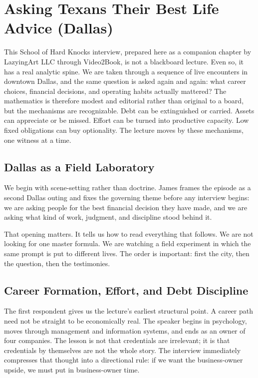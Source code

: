 \chapter{Asking Texans Their Best Life Advice (Dallas)}

This School of Hard Knocks interview, prepared here as a companion chapter by LazyingArt LLC through Video2Book, is not a blackboard lecture. Even so, it has a real analytic spine. We are taken through a sequence of live encounters in downtown Dallas, and the same question is asked again and again: what career choices, financial decisions, and operating habits actually mattered? The mathematics is therefore modest and editorial rather than original to a board, but the mechanisms are recognizable. Debt can be extinguished or carried. Assets can appreciate or be missed. Effort can be turned into productive capacity. Low fixed obligations can buy optionality. The lecture moves by these mechanisms, one witness at a time.

\section{Dallas as a Field Laboratory}

We begin with scene-setting rather than doctrine. James frames the episode as a second Dallas outing and fixes the governing theme before any interview begins: we are asking people for the best financial decision they have made, and we are asking what kind of work, judgment, and discipline stood behind it.

That opening matters. It tells us how to read everything that follows. We are not looking for one master formula. We are watching a field experiment in which the same prompt is put to different lives. The order is important: first the city, then the question, then the testimonies.

\section{Career Formation, Effort, and Debt Discipline}

The first respondent gives us the lecture's earliest structural point. A career path need not be straight to be economically real. The speaker begins in psychology, moves through management and information systems, and ends as an owner of four companies. The lesson is not that credentials are irrelevant; it is that credentials by themselves are not the whole story. The interview immediately compresses that thought into a directional rule: if we want the business-owner upside, we must put in business-owner time.

